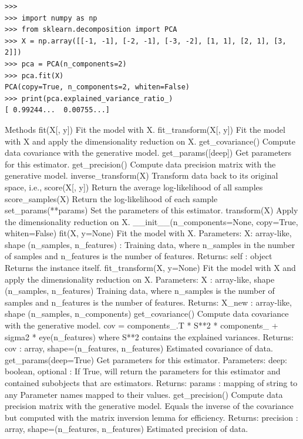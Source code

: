 \begin{frame}[fragile]
\begin{framed}
\begin{verbatim}
>>>
>>> import numpy as np
>>> from sklearn.decomposition import PCA
>>> X = np.array([[-1, -1], [-2, -1], [-3, -2], [1, 1], [2, 1], [3, 2]])
>>> pca = PCA(n_components=2)
>>> pca.fit(X)
PCA(copy=True, n_components=2, whiten=False)
>>> print(pca.explained_variance_ratio_) 
[ 0.99244...  0.00755...]
\end{verbatim}
\end{framed}
Methods
fit(X[, y])	Fit the model with X.
fit_transform(X[, y])	Fit the model with X and apply the dimensionality reduction on X.
get_covariance()	Compute data covariance with the generative model.
get_params([deep])	Get parameters for this estimator.
get_precision()	Compute data precision matrix with the generative model.
inverse_transform(X)	Transform data back to its original space, i.e.,
score(X[, y])	Return the average log-likelihood of all samples
score_samples(X)	Return the log-likelihood of each sample
set_params(**params)	Set the parameters of this estimator.
transform(X)	Apply the dimensionality reduction on X.
__init__(n_components=None, copy=True, whiten=False)
fit(X, y=None)
Fit the model with X.
Parameters:	
X: array-like, shape (n_samples, n_features) :
Training data, where n_samples in the number of samples and n_features is the number of features.
Returns:	
self : object
Returns the instance itself.
fit_transform(X, y=None)
Fit the model with X and apply the dimensionality reduction on X.
Parameters:	
X : array-like, shape (n_samples, n_features)
Training data, where n_samples is the number of samples and n_features is the number of features.
Returns:	
X_new : array-like, shape (n_samples, n_components)
get_covariance()
Compute data covariance with the generative model.
cov = components_.T * S**2 * components_ + sigma2 * eye(n_features) where S**2 contains the explained variances.
Returns:	
cov : array, shape=(n_features, n_features)
Estimated covariance of data.
get_params(deep=True)
Get parameters for this estimator.
Parameters:	
deep: boolean, optional :
If True, will return the parameters for this estimator and contained subobjects that are estimators.
Returns:	
params : mapping of string to any
Parameter names mapped to their values.
get_precision()
Compute data precision matrix with the generative model.
Equals the inverse of the covariance but computed with the matrix inversion lemma for efficiency.
Returns:	
precision : array, shape=(n_features, n_features)
Estimated precision of data.

\end{frame}
